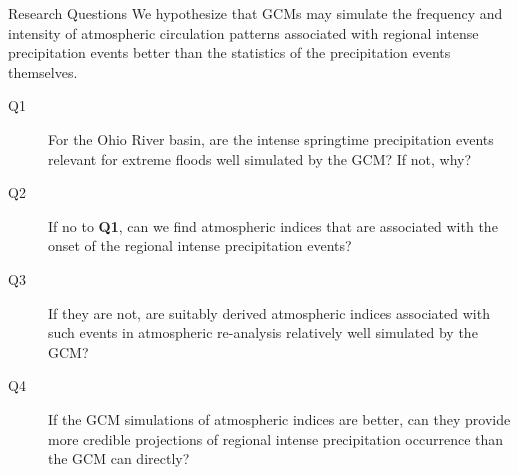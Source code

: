 \begin{block}{Research Questions}
  We hypothesize that GCMs may simulate the frequency and intensity  of atmospheric circulation patterns associated with regional intense precipitation events better than the statistics of the precipitation events themselves.
  \begin{description}
    \item[Q1] For the Ohio River basin, are the intense springtime precipitation events relevant for extreme floods well simulated by the GCM? If not, why?
    \item[Q2] If no to \textbf{Q1}, can we find atmospheric indices that are associated with the onset of the regional intense precipitation events?
    \item[Q3] If they are not, are suitably derived atmospheric indices associated with such events in atmospheric re-analysis relatively well simulated by the GCM?
    \item[Q4] If the GCM simulations of atmospheric indices are better, can they provide more credible projections of regional intense precipitation occurrence than the GCM can directly?
  \end{description}
\end{block}
